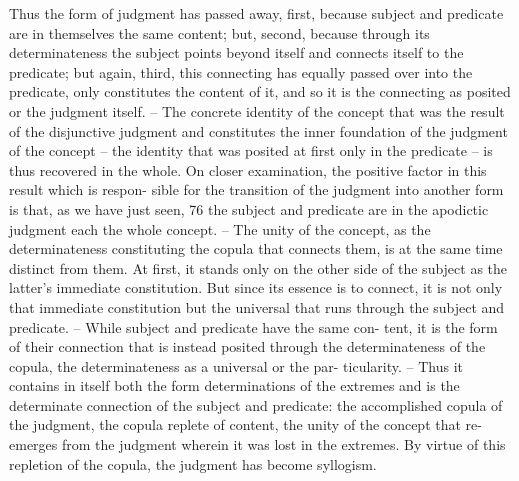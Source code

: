Thus the form of judgment has passed away, first, because subject and
predicate are in themselves the same content; but, second, because through
its determinateness the subject points beyond itself and connects itself to
the predicate; but again, third, this connecting has equally passed over into
the predicate, only constitutes the content of it, and so it is the connecting
as posited or the judgment itself. – The concrete identity of the concept
that was the result of the disjunctive judgment and constitutes the inner
foundation of the judgment of the concept – the identity that was posited
at first only in the predicate – is thus recovered in the whole.
On closer examination, the positive factor in this result which is respon-
sible for the transition of the judgment into another form is that, as we
have just seen, 76 the subject and predicate are in the apodictic judgment
each the whole concept. – The unity of the concept, as the determinateness
constituting the copula that connects them, is at the same time distinct
from them. At first, it stands only on the other side of the subject as the
latter's immediate constitution. But since its essence is to connect, it is not
only that immediate constitution but the universal that runs through the
subject and predicate. – While subject and predicate have the same con-
tent, it is the form of their connection that is instead posited through the
determinateness of the copula, the determinateness as a universal or the par-
ticularity. – Thus it contains in itself both the form determinations of the
extremes and is the determinate connection of the subject and predicate:
the accomplished copula of the judgment, the copula replete of content, the
unity of the concept that re-emerges from the judgment wherein it was lost
in the extremes.
By virtue of this repletion of the copula, the judgment has become syllogism.
